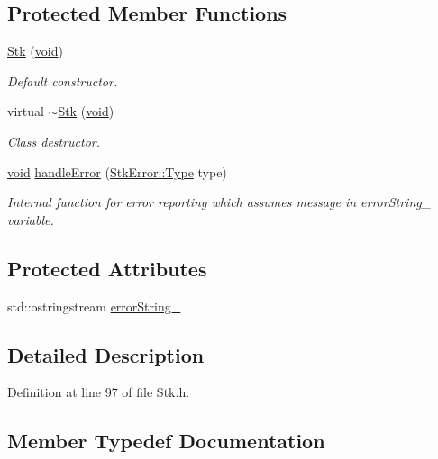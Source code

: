 \subsection*{Protected Member Functions}
\begin{DoxyCompactItemize}
\item 
\hyperlink{class_nyq_1_1_stk_a432702f3d61bdbd5691ec1fe83e95e63}{Stk} (\hyperlink{sound_8c_ae35f5844602719cf66324f4de2a658b3}{void})
\begin{DoxyCompactList}\small\item\em Default constructor. \end{DoxyCompactList}\item 
virtual \hyperlink{class_nyq_1_1_stk_a2d2e37fc5ff97bf8538ff92b12e54069}{$\sim$\+Stk} (\hyperlink{sound_8c_ae35f5844602719cf66324f4de2a658b3}{void})
\begin{DoxyCompactList}\small\item\em Class destructor. \end{DoxyCompactList}\item 
\hyperlink{sound_8c_ae35f5844602719cf66324f4de2a658b3}{void} \hyperlink{class_nyq_1_1_stk_abb5420cd69433c6b98a17c9b0dc88a79}{handle\+Error} (\hyperlink{class_nyq_1_1_stk_error_a5fde28aabab32abdb02b1078542bd3e8}{Stk\+Error\+::\+Type} type)
\begin{DoxyCompactList}\small\item\em Internal function for error reporting which assumes message in {\ttfamily error\+String\+\_\+} variable. \end{DoxyCompactList}\end{DoxyCompactItemize}
\subsection*{Protected Attributes}
\begin{DoxyCompactItemize}
\item 
std\+::ostringstream \hyperlink{class_nyq_1_1_stk_a5ef3185686e3fdb17fe7ec095e6f666f}{error\+String\+\_\+}
\end{DoxyCompactItemize}


\subsection{Detailed Description}


Definition at line 97 of file Stk.\+h.



\subsection{Member Typedef Documentation}
